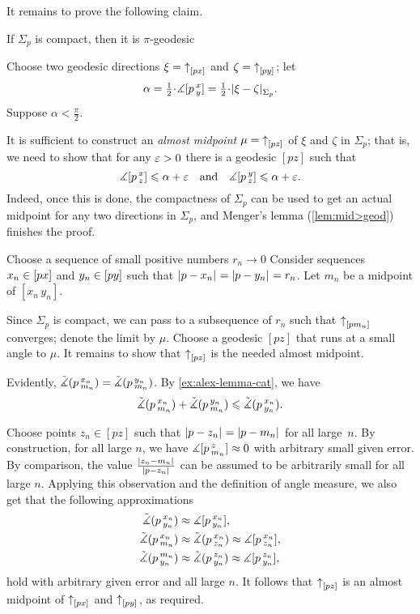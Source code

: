 It remains to prove the following claim.

\begin{clm}{}
If $\Sigma_p$ is compact, then it is $\pi$-geodesic
\end{clm}

Choose two geodesic directions $\xi={\uparrow}_{[{p}{x}]_{{}}}$ and $\zeta={\uparrow}_{[{p}{y}]_{{}}}$;
let 
\[\alpha\z=\tfrac12\cdot \mangle \hinge pxy=\tfrac12\cdot \dist{\xi}{\zeta}{\Sigma_p}.\]
Suppose $\alpha<\tfrac\pi2$.

It is sufficient to construct an \emph{almost midpoint} $\mu={\uparrow}_{[{p}{z}]_{{}}}$ of $\xi$ and $\zeta$ in $\Sigma_p$;
that is, we need to show that for any $\varepsilon>0$ there is a geodesic $[pz]$ such that
\[\measuredangle[p\,{}^{x}_{z}]\leqslant \alpha+\varepsilon
\quad\text{and}\quad
\measuredangle[p\,{}^{y}_{z}]\leqslant \alpha+\varepsilon.\]
Indeed, once this is done, the compactness of $\Sigma_p$ can be used to get an actual midpoint for any two directions in $\Sigma_p$, and Menger's lemma (\ref{lem:mid>geod}) finishes the proof.

Choose a sequence of small positive numbers $r_n\to0$
Consider sequences $x_n\in [px]$ and $y_n\in [py]$ such that $|{p}-{x_n}|_{}^{{}}=|{p}-{y_n}|_{}^{{}}=r_n$.
Let $m_n$ be a midpoint of $[x_n\,y_n]$.

Since $\Sigma_p$ is compact, we can pass to a subsequence of $r_n$ such that
${\uparrow}_{[{p}{m_n}]_{{}}}$ converges;
denote the limit by $\mu$.
Choose a geodesic $[pz]$ that runs at a small angle to $\mu$.
It remains to show that ${\uparrow}_{[{p}{z}]_{{}}}$ is the needed almost midpoint.

Evidently, $\tilde\measuredangle(p\,{}^{x_n}_{m_n})=\tilde\measuredangle(p\,{}^{y_n}_{m_n})$.
By \ref{ex:alex-lemma-cat}, we have
\[\tilde\measuredangle(p\,{}^{x_n}_{m_n})+\tilde\measuredangle(p\,{}^{y_n}_{m_n})\leqslant \tilde\measuredangle(p\,{}^{x_n}_{y_n}).\]

Choose points $z_n\in [pz]$ such that $|{p}-{z_n}|_{}^{{}}=|{p}-{m_n}|_{}^{{}}$ for all large~$n$.
By construction, for all large $n$, we have $\measuredangle[p\,{}^{z}_{m_n}]\approx0$  with arbitrary small given error.
By comparison, the value $\frac{|{z_n}-{m_n}|_{}^{{}}}{|{p}-{z_n}|_{}^{{}}}$ can be assumed to be arbitrarily small for all large $n$.
Applying this observation and the definition of angle measure, we also get that the following approximations
\begin{align*}
\tilde\measuredangle(p\,{}^{x_n}_{y_n})&\approx \measuredangle[p\,{}^{x_n}_{y_n}],
\\
\tilde\measuredangle(p\,{}^{x_n}_{m_n})&\approx\tilde\measuredangle(p\,{}^{x_n}_{z_n})\approx\measuredangle[p\,{}^{x_n}_{z_n}],
\\
\tilde\measuredangle(p\,{}^{m_n}_{y_n})&\approx\tilde\measuredangle(p\,{}^{z_n}_{y_n})\approx\measuredangle[p\,{}^{z_n}_{y_n}],
\end{align*}
hold with arbitrary given error and all large $n$.
It follows that ${\uparrow}_{[{p}{z}]_{{}}}$ is an almost midpoint of ${\uparrow}_{[{p}{x}]_{{}}}$ and ${\uparrow}_{[{p}{y}]_{{}}}$, as required.
\qeds

